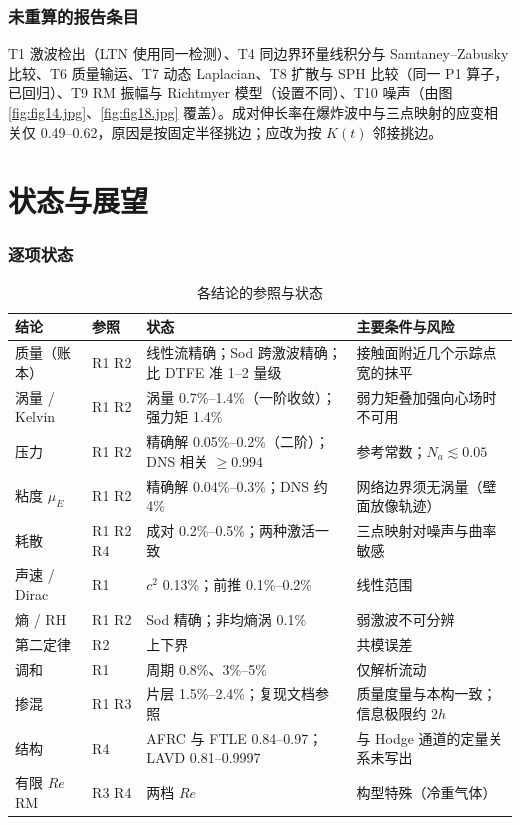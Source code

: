 \documentclass[11pt,a4paper]{article}
\begin{document}
\section{未重算的报告条目}
T1 激波检出（LTN 使用同一检测）、T4 同边界环量线积分与 Samtaney–Zabusky 比较、T6 质量输运、T7 动态 Laplacian、T8 扩散与 SPH 比较（同一 P1 算子，已回归）、T9 RM 振幅与 Richtmyer 模型（设置不同）、T10 噪声（由图 \ref{fig:fig14.jpg}、\ref{fig:fig18.jpg} 覆盖）。成对伸长率在爆炸波中与三点映射的应变相关仅 0.49–0.62，原因是按固定半径挑边；应改为按 $K(t)$ 邻接挑边。

\part{状态与展望}
\section{逐项状态}\label{sec:status}
\begin{longtable}{p{2.8cm}p{1.5cm}p{5.2cm}p{5.6cm}}
\caption{各结论的参照与状态}\\\toprule
结论 & 参照 & 状态 & 主要条件与风险\\\midrule\endhead
质量（账本） & R1 R2 & 线性流精确；Sod 跨激波精确；比 DTFE 准 1–2 量级 & 接触面附近几个示踪点宽的抹平\\
涡量 / Kelvin & R1 R2 & 涡量 0.7\%–1.4\%（一阶收敛）；强力矩 1.4\% & 弱力矩叠加强向心场时不可用\\
压力 & R1 R2 & 精确解 0.05\%–0.2\%（二阶）；DNS 相关 $\ge0.994$ & 参考常数；$N_a\lesssim0.05$\\
粘度 $\mu_E$ & R1 R2 & 精确解 0.04\%–0.3\%；DNS 约 4\% & 网络边界须无涡量（壁面放像轨迹）\\
耗散 & R1 R2 R4 & 成对 0.2\%–0.5\%；两种激活一致 & 三点映射对噪声与曲率敏感\\
声速 / Dirac & R1 & $c^2$ 0.13\%；前推 0.1\%–0.2\% & 线性范围\\
熵 / RH & R1 R2 & Sod 精确；非均熵涡 0.1\% & 弱激波不可分辨\\
第二定律 & R2 & 上下界 & 共模误差\\
调和 & R1 & 周期 0.8\%、3\%–5\% & 仅解析流动\\
掺混 & R1 R3 & 片层 1.5\%–2.4\%；复现文档参照 & 质量度量与本构一致；信息极限约 $2h$\\
结构 & R4 & AFRC 与 FTLE 0.84–0.97；LAVD 0.81–0.9997 & 与 Hodge 通道的定量关系未写出\\
有限 $Re$ RM & R3 R4 & 两档 $Re$ & 构型特殊（冷重气体）\\\bottomrule
\end{longtable}
\end{document}
